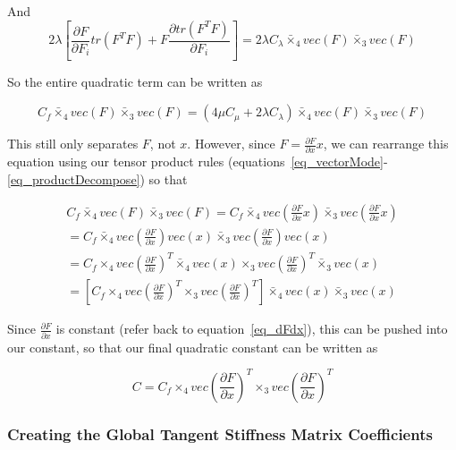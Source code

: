 \documentclass[twocolumn,10pt]{asme2ej}
\begin{document}
And
\begin{equation}
2\lambda[\frac{\partial F}{\partial F_i}tr(F^TF) + F\frac{\partial tr(F^TF)}{\partial F_i}] = 2\lambda C_{\lambda} \bar{\times}_4 vec(F) \bar{\times}_3 vec(F)
\end{equation}

So the entire quadratic term can be written as

\begin{equation}
C_f \bar{\times}_4 vec(F) \bar{\times}_3 vec(F) =  (4\mu C_{\mu} + 2\lambda C_{\lambda}) \bar{\times}_4 vec(F) \bar{\times}_3 vec(F)
\end{equation}

This still only separates $F$, not $x$. However, since $F = \frac{\partial F}{\partial x}x$, we can rearrange this equation using our tensor product rules (equations~\ref{eq_vectorMode}-\ref{eq_productDecompose}) so that
\begin{center}
  \begin{multline}
  C_f \bar{\times}_4 vec(F) \bar{\times}_3 vec(F) = C_f \bar{\times}_4 vec( \frac{\partial F}{\partial x}x) \bar{\times}_3 vec( \frac{\partial F}{\partial x}x)
  \\ = C_f \bar{\times}_4 vec( \frac{\partial F}{\partial x}) vec(x) \bar{\times}_3 vec( \frac{\partial F}{\partial x}) vec(x)
  \\ = C_f \times_4 vec( \frac{\partial F}{\partial x})^T \bar{\times}_4 vec(x) \times_3 vec( \frac{\partial F}{\partial x})^T \bar{\times}_3 vec(x)
  \\ = [C_f \times_4 vec( \frac{\partial F}{\partial x})^T \times_3 vec( \frac{\partial F}{\partial x})^T] \bar{\times}_4 vec(x) \bar{\times}_3 vec(x)
\end{multline}
\end{center}

Since $\frac{\partial F}{\partial x}$ is constant (refer back to equation~\ref{eq_dFdx}), this can be pushed into our constant, so that our final quadratic constant can be written as

\begin{equation}
C  = C_f \times_4 vec( \frac{\partial F}{\partial x})^T \times_3 vec( \frac{\partial F}{\partial x})^T
\label{eq_unreducedQuad}
\end{equation}

\subsubsection{Creating the Global Tangent Stiffness Matrix Coefficients}
\end{document}
